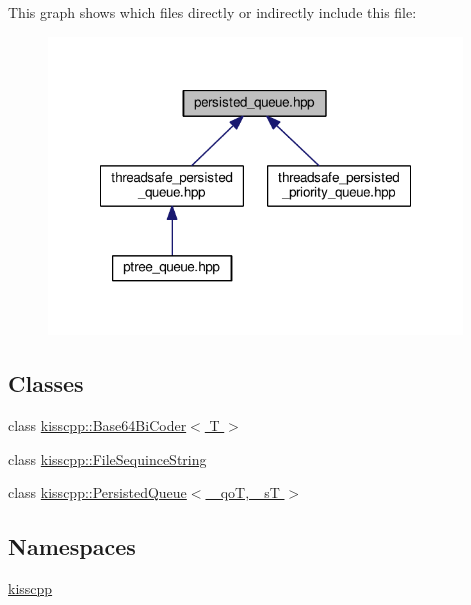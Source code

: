 This graph shows which files directly or indirectly include this file\-:\nopagebreak
\begin{figure}[H]
\begin{center}
\leavevmode
\includegraphics[width=311pt]{a00114}
\end{center}
\end{figure}
\subsection*{Classes}
\begin{DoxyCompactItemize}
\item 
class \hyperlink{a00019}{kisscpp\-::\-Base64\-Bi\-Coder$<$ T $>$}
\item 
class \hyperlink{a00026}{kisscpp\-::\-File\-Sequince\-String}
\item 
class \hyperlink{a00035}{kisscpp\-::\-Persisted\-Queue$<$ \-\_\-qo\-T, \-\_\-s\-T $>$}
\end{DoxyCompactItemize}
\subsection*{Namespaces}
\begin{DoxyCompactItemize}
\item 
\hyperlink{a00089}{kisscpp}
\end{DoxyCompactItemize}
